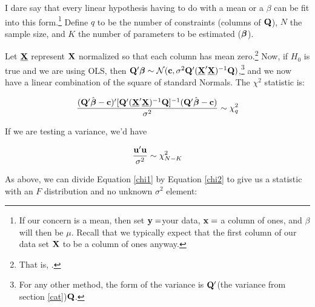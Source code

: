 I dare
say that every linear hypothesis having to do with a mean or a $\beta$ can be
fit into this form.\footnote{If our concern is a mean, then set
${\bf y}=$your data, ${\bf x}=$ a column of ones, and $\beta$ will then be
$\mu$. Recall that we typically expect that the first column of our data
set ${\bf X}$ to
be a column of ones anyway.}
Define $q$ to be the number of constraints (columns
of ${\bf Q}$), $N$ the sample size, and $K$ the number of parameters to be
estimated (${\mbox{\boldmath$\beta$}}$).

Let $\underbar{\bf X}$ represent ${\bf X}$ normalized so that each column has mean
zero.\footnote{That is, .}
Now, if $H_0$ is true and we are using OLS, then ${\bf Q}' {\mbox{\boldmath$\beta$}} \sim {\cal
N}({\bf c}, \sigma^2 {\bf Q}' (\underbar{\bf X}'\underbar{\bf X})^{-1} {\bf Q})$,\footnote{For any other
method, the form of the variance is ${\bf Q}'$(the variance from section
\ref{cat})${\bf Q}$.} and we now have a linear combination of the square of
standard Normals. The $\chi^2$ statistic is:

\begin{equation}		\label{chi1}
{({\bf Q}'\hat{{\mbox{\boldmath$\beta$}}}- {\bf c})' [{\bf Q}' (\underbar{\bf X}'\underbar{\bf X})^{-1} {\bf Q}]^{-1} ({\bf Q}' \hat{{\mbox{\boldmath$\beta$}}}- {\bf c})
\over \sigma^2} \sim \chi^2_q
\end{equation}

If we are testing a variance, we'd have 

\begin{equation}		\label{chi2}
{{\bf u}' {\bf u} \over \sigma^2} \sim \chi^2_{N-K}
\end{equation}



As above, we can divide Equation \ref{chi1} by Equation \ref{chi2}
to give us a statistic with an $F$ distribution and no unknown
$\sigma^2$ element:



